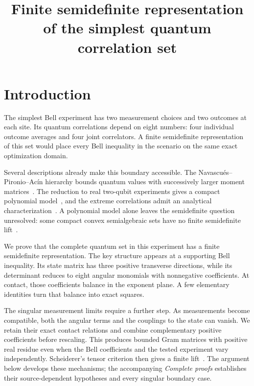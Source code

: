 \documentclass[11pt,a4paper]{article}
\title{Finite semidefinite representation of the simplest quantum correlation set}
\author{}
\date{}
\theoremstyle{definition}
\begin{document}
\makeatletter
\begin{center}
{\LARGE\@title\par}
\end{center}
\makeatother
\vspace{1em}
\begin{abstract}

\end{abstract}

\section{Introduction}

The simplest Bell experiment has two measurement choices and two outcomes
at each site. Its quantum correlations depend on eight numbers: four
individual outcome averages and four joint correlators. A finite
semidefinite representation of this set would place every Bell inequality
in the scenario on the same exact optimization domain.

Several descriptions already make this boundary accessible. The
Navascu\'es--Pironio--Ac\'in hierarchy bounds quantum values with
successively larger moment matrices~\cite{NPA}. The reduction to real
two-qubit experiments gives a compact polynomial model~\cite{Masanes},
and the extreme correlations admit an analytical
characterization~\cite{BarizienBancal}. A polynomial model alone leaves
the semidefinite question unresolved: some compact convex semialgebraic
sets have no finite semidefinite lift~\cite{Shadows}.

We prove that the complete quantum set in this experiment has a finite
semidefinite representation. The key structure appears at a supporting
Bell inequality. Its state matrix has three positive transverse
directions, while its determinant reduces to eight angular monomials
with nonnegative coefficients. At contact, those coefficients balance
in the exponent plane. A few elementary identities turn that balance
into exact squares.

The singular measurement limits require a further step. As measurements
become compatible, both the angular terms and the couplings to the state
can vanish. We retain their exact contact relations and combine
complementary positive coefficients before rescaling. This produces
bounded Gram matrices with positive real residue even when the Bell
coefficients and the tested experiment vary independently.
Scheiderer's tensor criterion then gives a finite lift~\cite{Scheiderer}.
The argument below develops these mechanisms; the accompanying
\emph{Complete proofs} establishes their source-dependent hypotheses
and every singular boundary case.
\end{document}
